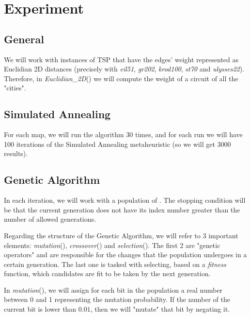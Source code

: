 \documentclass[a4paper]{article}
\begin{document}
\section{Experiment}

\subsection{General}

We will work with instances of TSP that have the edges' weight represented as Euclidian 2D distances (precisely with \textit{eil51}\cite{instances}, \textit{gr202}\cite{instances}, \textit{krod100}\cite{instances}, \textit{st70}\cite{instances} and \textit{ulysses22}\cite{instances}). Therefore, in {\itshape Euclidian\_2D}() we will compute the weight of a circuit of all the "cities".

\subsection{Simulated Annealing}

For each map, we will run the algorithm 30 times, and for each run we will have 100 iterations of the Simulated Annealing metaheuristic (so we will get $3000$ results).

\subsection{Genetic Algorithm}

In each iteration, we will work with a population of . The stopping condition will be that the current generation does not have its index number greater than the number of allowed generations.

Regarding the structure of the Genetic Algorithm, we will refer to 3 important elements: {\itshape mutation}(), {\itshape crossover}() and {\itshape selection}(). The first 2 are "genetic operators" and are responsible for the changes that the population undergoes in a certain generation. The last one is tasked with selecting, based on a {\itshape fitness} function, which candidates are fit to be taken by the next generation.

In {\itshape mutation}(), we will assign for each bit in the population a real number between 0 and 1 representing the mutation probability. If the number of the current bit is lower than $0.01$, then we will "mutate" that bit by negating it.
\end{document}
